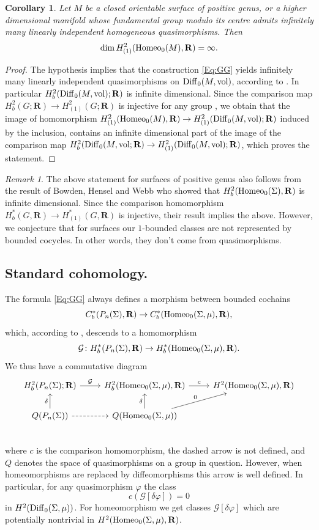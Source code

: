 \documentclass[11pt]{amsart}
\newtheorem{corollary}[subsection]{Corollary}
\theoremstyle{definition}
\theoremstyle{remark}
\newtheorem{remark}[subsection]{Remark}
\numberwithin{equation}{section}
\numberwithin{figure}{section}
\newcommand{\B}[1]{{\mathbf #1}}
\newcommand{\C}[1]{{\mathcal #1}}
\begin{document}
\begin{corollary}\label{C:h2b}
Let $M$ be a closed orientable surface of positive genus, or a higher dimensional manifold whose fundamental group modulo its centre admits infinitely many linearly independent homogeneous quasimorphisms. Then
$$
\dim H^2_{(1)}({\rm Homeo}_0(M),\B R) = \infty.
$$
\end{corollary}
\begin{proof}
The hypothesis implies that the construction \eqref{Eq:GG} yields infinitely many
linearly independent quasimorphisms on ${\rm Diff}_0(M,{\rm vol})$, according to
\cite{zbMATH06490154,zbMATH06814502}. In particular $H^2_b({\rm Diff}_0(M,{\rm vol});\B R)$ is infinite dimensional. Since the comparison map
$H^2_b(G;\B R)\to H^2_{(1)}(G;\B R)$ is injective for any group \cite{arXiv:2208.03168}, we obtain that the image of homomorphism 
$H^2_{(1)}({\rm Homeo}_0(M),\B R)\to H^2_{(1)}({\rm Diff}_0(M,{\rm vol});\B R)$ induced by the inclusion, contains an infinite dimensional part of the image of
the comparison map 
$H^2_b({\rm Diff}_0(M,{\rm vol};\B R)\to H^2_{(1)}({\rm Diff}_0(M,{\rm vol});\B R)$,
which proves the statement.
\end{proof}
\begin{remark}
The above statement for surfaces of positive genus also follows from the result of Bowden, Hensel and Webb
\cite[Theorem 1.4]{zbMATH07420183} who showed that $H^2_b({\rm Homeo}_0(\Sigma),\B R)$ is infinite dimensional.
Since the comparison homomorphism 
$H^*_b(G,\B R)\to H^*_{(1)}(G,\B R)$
is injective, their result implies the above. However, we conjecture that for surfaces our $1$-bounded
classes are not represented by bounded cocycles. In other words, they don't
come from quasimorphisms.
\end{remark}


\subsection*{Standard cohomology.}
The formula \eqref{Eq:GG} always defines a morphism between bounded
cochains 
$$C^*_b(P_n(\Sigma),\B R)\to C^*_b({\rm Homeo}_0(\Sigma,\mu),\B R),$$
which, according to \cite{zbMATH07503455}, descends to a homomorphism 
$$\C G\colon H^*_b(P_n(\Sigma),\B R)\to H^*_b({\rm Homeo}_0(\Sigma,\mu),\B R).$$ 
We thus have a commutative diagram
$$
\begin{tikzcd}
H^2_b(P_n(\Sigma);\B R)\ar[r,"\C G"] & H^2_b({\rm Homeo}_0(\Sigma,\mu),\B R)\ar[r,"c"] & H^2({\rm Homeo}_0(\Sigma,\mu),\B R)\\
Q(P_n(\Sigma))\ar[r, dashed]\ar[u,"\delta"] & Q({\rm Homeo}_0(\Sigma,\mu))\ar[ur,"0"] \ar[u,"\delta"] \\
\end{tikzcd}
$$
where $c$ is the comparison homomorphism,
the dashed arrow is not defined, and $Q$ denotes the space of quasimorphisms on a group in question. 
However, when homeomorphisms are replaced
by diffeomorphisms this arrow is well defined. In particular, for any quasimorphism
$\varphi$ the class 
$$c(\C G[\delta \varphi])=0$$
in $H^2({\rm Diff}_0(\Sigma,\mu))$. 
For homeomorphism we get classes $\C G[\delta\varphi]$ which are potentially
nontrivial in $H^2({\rm Homeo}_0(\Sigma,\mu),\B R)$.
\end{document}
